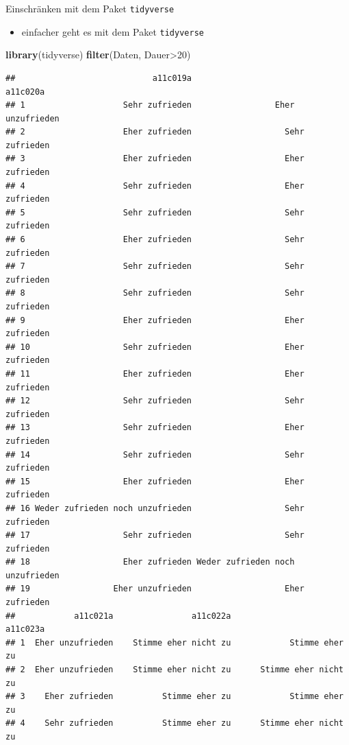 \documentclass[ignorenonframetext,]{beamer}
\newenvironment{Shaded}{}{}
\newcommand{\KeywordTok}[1]{\textcolor[rgb]{0.00,0.44,0.13}{\textbf{{#1}}}}
\newcommand{\DecValTok}[1]{\textcolor[rgb]{0.25,0.63,0.44}{{#1}}}
\newcommand{\NormalTok}[1]{{#1}}
\providecommand{\tightlist}{%
\setlength{\itemsep}{0pt}\setlength{\parskip}{0pt}}
\begin{document}
\begin{frame}[fragile]{Einschränken mit dem Paket \texttt{tidyverse}}

\begin{itemize}
\tightlist
\item
  einfacher geht es mit dem Paket \texttt{tidyverse}
\end{itemize}

\begin{Shaded}
\begin{Highlighting}[]
\KeywordTok{library}\NormalTok{(tidyverse)}
\KeywordTok{filter}\NormalTok{(Daten, Dauer>}\DecValTok{20}\NormalTok{)}
\end{Highlighting}
\end{Shaded}

\begin{verbatim}
##                            a11c019a                         a11c020a
## 1                    Sehr zufrieden                 Eher unzufrieden
## 2                    Eher zufrieden                   Sehr zufrieden
## 3                    Eher zufrieden                   Eher zufrieden
## 4                    Sehr zufrieden                   Eher zufrieden
## 5                    Sehr zufrieden                   Sehr zufrieden
## 6                    Eher zufrieden                   Sehr zufrieden
## 7                    Sehr zufrieden                   Sehr zufrieden
## 8                    Sehr zufrieden                   Sehr zufrieden
## 9                    Eher zufrieden                   Eher zufrieden
## 10                   Sehr zufrieden                   Eher zufrieden
## 11                   Eher zufrieden                   Eher zufrieden
## 12                   Sehr zufrieden                   Sehr zufrieden
## 13                   Sehr zufrieden                   Eher zufrieden
## 14                   Sehr zufrieden                   Sehr zufrieden
## 15                   Eher zufrieden                   Eher zufrieden
## 16 Weder zufrieden noch unzufrieden                   Sehr zufrieden
## 17                   Sehr zufrieden                   Sehr zufrieden
## 18                   Eher zufrieden Weder zufrieden noch unzufrieden
## 19                 Eher unzufrieden                   Eher zufrieden
##            a11c021a                a11c022a                  a11c023a
## 1  Eher unzufrieden    Stimme eher nicht zu            Stimme eher zu
## 2  Eher unzufrieden    Stimme eher nicht zu      Stimme eher nicht zu
## 3    Eher zufrieden          Stimme eher zu            Stimme eher zu
## 4    Sehr zufrieden          Stimme eher zu      Stimme eher nicht zu

\end{verbatim}
\end{frame}
\end{document}

